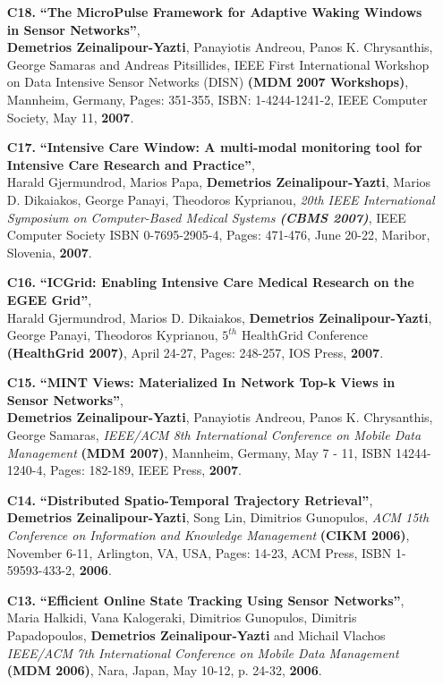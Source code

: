 \documentclass[10pt]{article}
\begin{document}
\begin{enumerate}
\item[{\bf C18.}]
\label{C18}
{\bf ``The MicroPulse Framework for Adaptive Waking Windows in Sensor Networks''}, \\
{\bf Demetrios Zeinalipour-Yazti}, Panayiotis Andreou, Panos K. Chrysanthis, George Samaras and Andreas Pitsillides, 
IEEE First International Workshop on Data Intensive Sensor Networks (DISN)
{\bf (MDM 2007 Workshops)}, Mannheim, Germany, Pages: 351-355, ISBN: 1-4244-1241-2, IEEE Computer Society, May 11, {\bf 2007}.
 

\item[{\bf C17.}]
\label{C17}
{\bf ``Intensive Care Window: A multi-modal monitoring tool for Intensive Care Research and Practice''},\\
Harald Gjermundrod, Marios Papa, {\bf Demetrios Zeinalipour-Yazti}, Marios D. Dikaiakos, George Panayi, Theodoros Kyprianou, {\em 20th IEEE International Symposium on Computer-Based Medical Systems {\bf (CBMS 2007)}},
IEEE Computer Society ISBN 0-7695-2905-4,  Pages: 471-476, June 20-22, Maribor, Slovenia, {\bf 2007}.

\item[{\bf C16.}]
\label{C16}
{\bf ``ICGrid: Enabling Intensive Care Medical Research on the EGEE Grid''}, \\
Harald Gjermundrod, Marios D. Dikaiakos, {\bf Demetrios Zeinalipour-Yazti}, George Panayi, Theodoros Kyprianou,
$5^{th}$ HealthGrid Conference  {\bf (HealthGrid 2007)}, April 24-27, Pages: 248-257, IOS Press, {\bf 2007}.  

\item[{\bf C15.}]
\label{C15}  
{\bf ``MINT Views: Materialized In Network Top-k Views in Sensor Networks''}, \\
{\bf Demetrios Zeinalipour-Yazti}, Panayiotis Andreou, Panos K. Chrysanthis, George Samaras, 
{\em IEEE/ACM 8th International Conference on Mobile Data Management} {\bf (MDM 2007)},
Mannheim, Germany, May 7 - 11, ISBN 14244-1240-4, Pages: 182-189, IEEE Press, {\bf 2007}. 

\item[{\bf C14.}]
\label{C14}  
{\bf ``Distributed Spatio-Temporal Trajectory Retrieval''}, \\
{\bf Demetrios Zeinalipour-Yazti}, Song Lin, Dimitrios Gunopulos, 
{\em ACM 15th Conference on Information and Knowledge Management} {\bf (CIKM 2006)}, 
November 6-11, Arlington, VA, USA, Pages: 14-23, ACM Press, ISBN 1-59593-433-2, {\bf 2006}. 

\item[{\bf C13.}]
 \label{C13}  
{\bf ``Efficient Online State Tracking Using Sensor Networks''}, \\
Maria Halkidi, Vana Kalogeraki, Dimitrios Gunopulos, Dimitris Papadopoulos, {\bf Demetrios Zeinalipour-Yazti} and Michail Vlachos
{\em IEEE/ACM 7th International Conference on Mobile Data Management} {\bf (MDM 2006)},
Nara, Japan, May 10-12, p. 24-32, {\bf 2006}. 


\end{enumerate}
\end{document}
